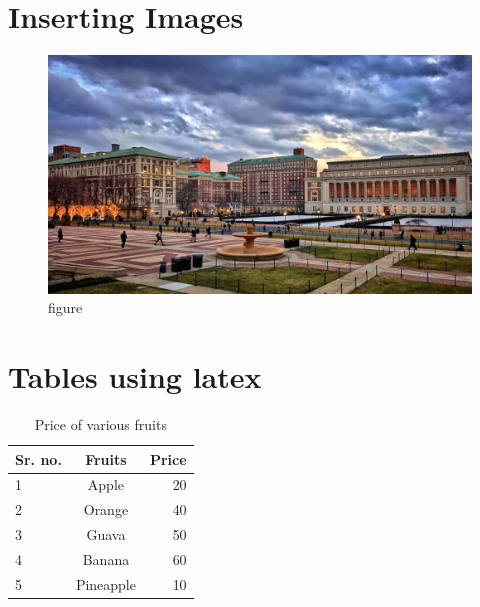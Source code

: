 \documentclass[12pt]{article}
\begin{document}
\newpage

\section{Inserting Images}
     \begin{figure} [h]
     \centering
     \includegraphics[width=0.8\linewidth]{85.jpg}
     \caption{figure}
      \label{fig:85}
\end{figure}
\newpage





\begin{table}

\section{Tables using latex}

\begin{center}



\caption{Price of various fruits}

\label{ A ) }


\begin{tabular}{|l|c|r|}

\textbf{Sr. no.} & 
\textbf{Fruits} &
\textbf{Price}\\

\hline
1	 & 		Apple		 & 	20		\\
2	 & 		Orange		 & 	40		\\
3	 & 		Guava    	 & 	50		\\
4	 & 		Banana   	 & 	60		\\
5	 & 		Pineapple	 & 	10		\\


\end{tabular}

\end{center}

\end{table}
\end{document}
